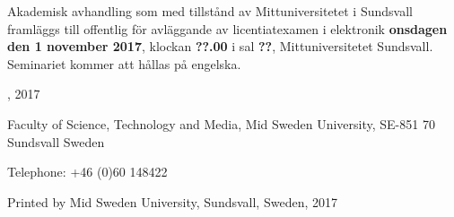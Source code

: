 \thispagestyle{empty}

{\raggedright
Akademisk avhandling som med tillstånd av Mittuniversitetet i Sundsvall framläggs till offentlig för avläggande av licentiatexamen i elektronik \textbf{onsdagen den 1 november 2017}, klockan \textbf{??.00} i sal \textbf{??}, Mittuniversitetet Sundsvall. Seminariet kommer att hållas på engelska.

\vfill

{\large\thetitle}

\vspace{1cm}

\theauthor

\vspace{1cm}

\textcopyright  \theauthor, 2017
\vspace{1cm}

Faculty of Science, Technology and Media,
Mid Sweden University, SE-851 70 Sundsvall
Sweden

\vspace{1cm}

Telephone: +46 (0)60 148422

\vspace{1cm}

Printed by Mid Sweden University, Sundsvall, Sweden, 2017
}